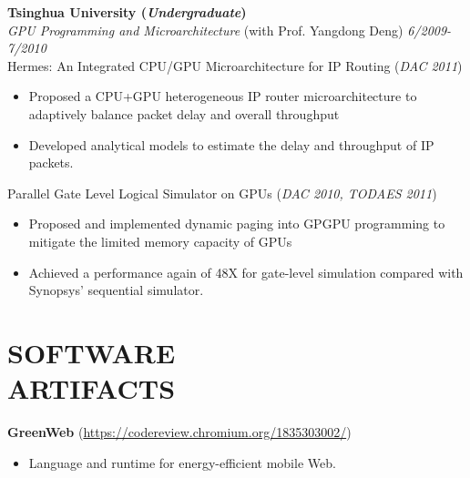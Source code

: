 \documentclass[margin, 9pt]{res} %
\begin{document}
\begin{resume}
\bigskip
{\large\textbf{Tsinghua University (\textit{Undergraduate})}}\\

\vspace*{-7pt}
{\large\textit{GPU Programming and Microarchitecture} (with Prof. Yangdong Deng)} \hfill\textit{6/2009-7/2010}\\

\vspace*{-7pt}
Hermes: An Integrated CPU/GPU Microarchitecture for IP Routing \hfill(\textit{DAC 2011})\\
\vspace*{-10pt}
\begin{itemize}[leftmargin=*] \itemsep -3pt
\vspace*{-5pt}
	\item Proposed a CPU+GPU heterogeneous IP router microarchitecture to adaptively balance packet delay and overall throughput
	\item Developed analytical models to estimate the delay and throughput of IP packets.
\end{itemize}

\medskip
Parallel Gate Level Logical Simulator on GPUs \hfill(\textit{DAC 2010, TODAES 2011})\\
\vspace*{-10pt}
\begin{itemize}[leftmargin=*] \itemsep -3pt
\vspace*{-5pt}
	\item Proposed and implemented dynamic paging into GPGPU programming to mitigate the limited memory capacity of GPUs
	\item Achieved a performance again of 48X for gate-level simulation compared with Synopsys' sequential simulator.
\end{itemize}


\section{SOFTWARE\\ ARTIFACTS}

\textbf{GreenWeb} (\url{https://codereview.chromium.org/1835303002/})
\begin{itemize}[leftmargin=*] \itemsep -3pt
\vspace*{-4pt}
  \item Language and runtime for energy-efficient mobile Web.
\end{itemize}


\end{resume}
\end{document}
